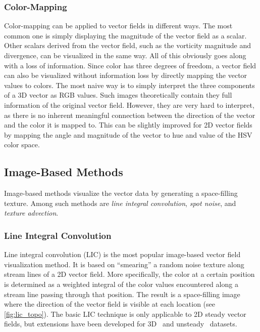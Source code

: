 %
\subsubsection{Color-Mapping}
%
Color-mapping can be applied to vector fields in different ways.
%
The most common one is simply displaying the magnitude of the vector field as a
scalar.
%
Other scalars derived from the vector field, such as the vorticity magnitude and
divergence, can be visualized in the same way.
%
All of this obviously goes along with a loss of information.
%
Since color has three degrees of freedom, a vector field can also be visualized
without information loss by directly mapping the vector values to colors.
%
The most naive way is to simply interpret the three components of a \ac{3D}
vector as RGB values.
%
Such images theoretically contain they full information of the original vector
field.
%
However, they are very hard to interpret, as there is no inherent meaningful
connection between the direction of the vector and the color it is mapped to.
%
This can be slightly improved for \ac{2D} vector fields by mapping the angle
and magnitude of the vector to hue and value of the HSV color space.
%
%
\subsection{Image-Based Methods} %
\label{sub:vector_image_based}
%
Image-based methods visualize the vector data by generating a space-filling
texture.
%
Among such methods are \emph{line integral convolution}, \emph{spot noise},
and \emph{texture advection}.
%

%
\subsubsection{Line Integral Convolution}
%
Line integral convolution (\acs{LIC})\cite{Cabral1993} is the most
popular image-based vector field visualization method.
%
It is based on ``smearing'' a random noise texture along stream lines of a
\ac{2D} vector field.
%
More specifically, the color at a certain position is determined as a weighted
integral of the color values encountered along a stream line passing through
that position.
%
The result is a space-filling image where the direction of the vector field is
visible at each location (see \autoref{fig:lic_topo}).
%
The basic \ac{LIC} technique is only applicable to \ac{2D} steady vector fields,
but extensions have been developed for \ac{3D}~\cite{Rezk-Salama1999} and
unsteady~\cite{Shen1997} datasets.
%

